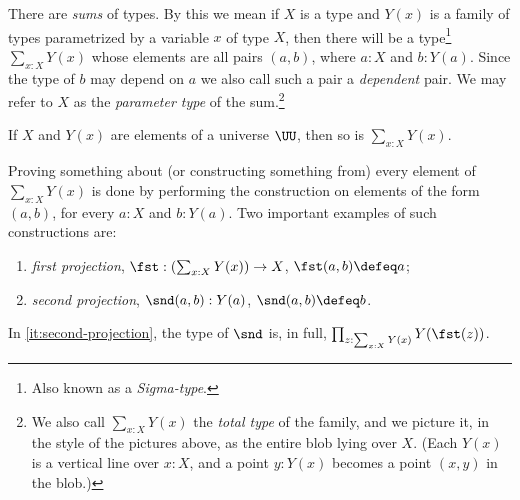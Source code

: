 There are \emph{sums} of types.
By this we mean if $X$ is a type and $Y(x)$ is a family of types parametrized by a variable $x$ of type $X$, then
there will be a type\footnote{%
  Also known as a \emph{Sigma-type}.}
$\sum _{x:X} Y(x)$ whose elements are all pairs $(a,b)$, where $a:X$ and $b:Y(a)$. Since the type of $b$ may depend on $a$ we also call such a pair
a \emph{dependent} pair. We may refer to $X$ as the \emph{parameter
  type} of the sum.\footnote{%
  We also call $\sum_{x:X}Y(x)$ the \emph{total type} of the family,
  and we picture it, in the style of the pictures above,
  as the entire blob lying over $X$. (Each $Y(x)$ is a vertical line over $x:X$,
  and a point $y:Y(x)$ becomes a point $(x,y)$ in the blob.)\par
  }

If $X$ and $Y(x)$ are elements of a universe $\UU$, then so is $\sum _{x:X} Y(x)$.

Proving something about (or constructing something from) every
element of $\sum _{x:X} Y(x)$ is done by performing the construction on elements of the form $(a,b)$, for every $a:X$ and $b: Y(a)$.
Two important examples of such constructions are:
\begin{enumerate}
\item \emph{first projection},
$\fst:(\sum _{x:X} Y(x)) \to X$,
$\fst(a,b)\defeq a$;
\item\label{it:second-projection} \emph{second projection},
$\snd(a,b): Y(a)$,
$\snd(a,b)\defeq b$.
\end{enumerate}
In \ref{it:second-projection}, the type of $\snd$ is, in full,
$\prod_{z:\sum_{x:X} Y(x)} Y(\fst(z))$.

